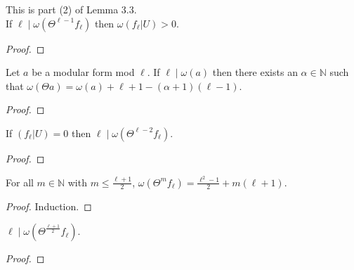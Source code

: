 \begin{theorem}
  \label{thm:Filt_U_pos}
  \leanok
  This is part (2) of Lemma 3.3. \\
  If $\ell \mid \omega (\Theta^{\ell - 1} f_\ell)$ then 
  $\omega (f_\ell | U) > 0$.
\end{theorem}
\begin{proof}
  \leanok
\end{proof}


\begin{lemma}
  \label{lem:Filt_Theta_congruence_of_div} 
  \leanok
  Let $a$ be a modular form mod $\ell$. If $\ell \mid \omega (a)$ then
  there exists an $\alpha \in \mathbb{N}$ such that 
  $\omega (\Theta a) = \omega (a) + \ell + 1 - (\alpha + 1) (\ell - 1)$.
\end{lemma}
\begin{proof}
  \leanok
\end{proof}


\begin{theorem}
  \label{thm:Filt_Theta_l_sub_two}
  \leanok
  If $(f_\ell | U) = 0$ then $\ell \mid \omega (\Theta^{\ell - 2} f_\ell)$.
\end{theorem}
\begin{proof}
  \leanok
\end{proof}


\begin{lemma}
  \label{lem:Filt_Theta_lel_add_one_div_two}
  \leanok
  For all $m \in \mathbb{N}$ with $m \le \frac{\ell + 1}{2}$,
  $\omega (\Theta^m f_\ell) = \frac{\ell^2 - 1}{2} + m (\ell + 1)$.
\end{lemma}
\begin{proof}
  \leanok
  Induction.
\end{proof}


\begin{theorem}
  \label{thm:Filt_Theta_l_add_one_div_two}
  \leanok
  $\ell \mid \omega (\Theta^{\frac{\ell + 1}{2}} f_\ell)$.
\end{theorem}
\begin{proof}
  \leanok
\end{proof}


